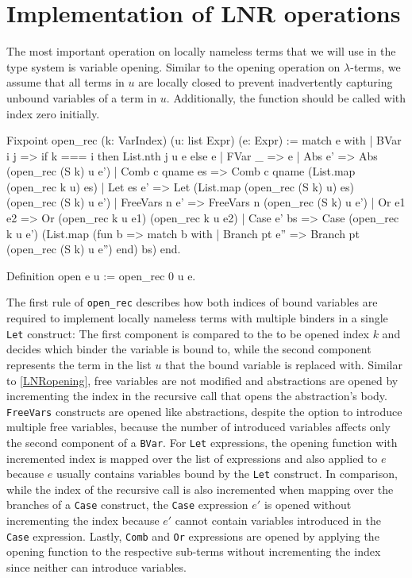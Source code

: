 \documentclass[a4paper, 11pt, fleqn]{scrreprt}
\newcommand{\coqinline}[1]{\texttt{#1}}
\begin{document}
	\section{Implementation of LNR operations}
	The most important operation on locally nameless terms that we will use in the type system is variable opening. Similar to the opening operation on $\lambda$-terms, we assume that all terms in $u$ are locally closed to prevent inadvertently capturing unbound variables of a term in $u$. Additionally, the function should be called with index zero initially.
\begin{coqcode}
Fixpoint open_rec (k: VarIndex) (u: list Expr) (e: Expr) :=
  match e with
  | BVar i j => if k === i then List.nth j u e else e
  | FVar _ => e
  | Abs e' => Abs (open_rec (S k) u e')
  | Comb c qname es => Comb c qname (List.map (open_rec k u) es)
  | Let es e' => Let (List.map (open_rec (S k) u) es) (open_rec (S k) u e')
  | FreeVars n e' => FreeVars n (open_rec (S k) u e')
  | Or e1 e2 => Or (open_rec k u e1) (open_rec k u e2)
  | Case e' bs => Case (open_rec k u e')
                       (List.map (fun b => match b with
                                           | Branch pt e'' =>
                                             Branch pt (open_rec (S k) u e'')
                                           end)
                       bs)
  end.

Definition open e u := open_rec 0 u e.
\end{coqcode}
	The first rule of \coqinline{open_rec} describes how both indices of bound variables are required to implement locally nameless terms with multiple binders in a single \coqinline{Let} construct: The first component is compared to the to be opened index $k$ and decides which binder the variable is bound to, while the second component represents the term in the list $u$ that the bound variable is replaced with. Similar to \autoref{LNRopening}, free variables are not modified and abstractions are opened by incrementing the index in the recursive call that opens the abstraction's body. \coqinline{FreeVars} constructs are opened like abstractions, despite the option to introduce multiple free variables, because the number of introduced variables affects only the second component of a \coqinline{BVar}.
	For \coqinline{Let} expressions, the opening function with incremented index is mapped over the list of expressions and also applied to $e$ because $e$ usually contains variables bound by the \coqinline{Let} construct. In comparison, while the index of the recursive call is also incremented when mapping over the branches of a \coqinline{Case} construct, the \coqinline{Case} expression $e'$ is opened without incrementing the index because $e'$ cannot contain variables introduced in the \coqinline{Case} expression. Lastly, \coqinline{Comb} and \coqinline{Or} expressions are opened by applying the opening function to the respective sub-terms without incrementing the index since neither can introduce variables.
	
\end{document}
